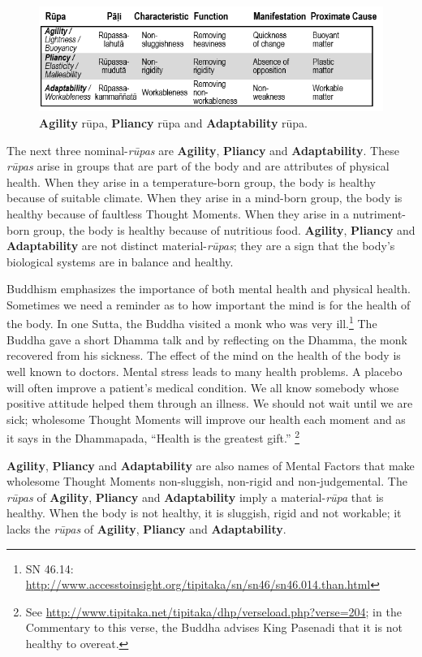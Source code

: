 \begin{figure}[h]
\centering
\includegraphics[width=0.8\linewidth]{./Diagrams/Agility}
\caption{\textbf{Agility} rūpa, \textbf{Pliancy} rūpa and \textbf{Adaptability} rūpa.}
\label{fig:Agility}
\end{figure}

The next three nominal-\textit{rūpas} are \textbf{Agility}, \textbf{Pliancy} and \textbf{Adaptability}. These \textit{rūpas} arise in groups that are part of the body and are attributes of physical health. When they arise in a temperature-born group, the body is healthy because of suitable climate. When they arise in a mind-born group, the body is healthy because of faultless Thought Moments. When they arise in a nutriment-born group, the body is healthy because of nutritious food. \textbf{Agility}, \textbf{Pliancy} and \textbf{Adaptability} are not distinct material-\textit{rūpas}; they are a sign that the body’s biological systems are in balance and healthy.

Buddhism emphasizes the importance of both mental health and physical health. Sometimes we need a reminder as to how important the mind is for the health of the body. In one Sutta, the Buddha visited a monk who was very ill.\footnote{SN 46.14: \url{http://www.accesstoinsight.org/tipitaka/sn/sn46/sn46.014.than.html}} The Buddha gave a short Dhamma talk and by reflecting on the Dhamma, the monk recovered from his sickness. The effect of the mind on the health of the body is well known to doctors. Mental stress leads to many health problems. A placebo will often improve a patient’s medical condition. We all know somebody whose positive attitude helped them through an illness. We should not wait until we are sick; wholesome Thought Moments will improve our health each moment and as it says in the Dhammapada, “Health is the greatest gift.” \footnote{See \url{http://www.tipitaka.net/tipitaka/dhp/verseload.php?verse=204}; in the Commentary to this verse, the Buddha advises King Pasenadi that it is not healthy to overeat.}

\textbf{Agility}, \textbf{Pliancy} and \textbf{Adaptability} are also names of Mental Factors that make wholesome Thought Moments non-sluggish, non-rigid and non-judgemental. The \textit{rūpas} of \textbf{Agility}, \textbf{Pliancy} and \textbf{Adaptability} imply a material-\textit{rūpa} that is healthy. When the body is not healthy, it is sluggish, rigid and not workable; it lacks the \textit{rūpas} of \textbf{Agility}, \textbf{Pliancy} and \textbf{Adaptability}.

